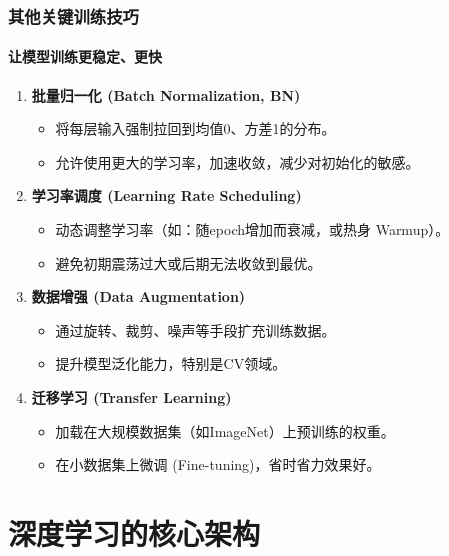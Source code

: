 \documentclass[12pt, t, aspectratio=169]{beamer}
\begin{document}
\begin{frame}
    \frametitle{其他关键训练技巧}
    \framesubtitle{让模型训练更稳定、更快}
    
    \begin{enumerate}
        \item \textbf{批量归一化 (Batch Normalization, BN)}
        \begin{itemize}
            \item 将每层输入强制拉回到均值0、方差1的分布。
            \item 允许使用更大的学习率，加速收敛，减少对初始化的敏感。
        \end{itemize}
        
        \item \textbf{学习率调度 (Learning Rate Scheduling)}
        \begin{itemize}
            \item 动态调整学习率（如：随epoch增加而衰减，或热身 Warmup）。
            \item 避免初期震荡过大或后期无法收敛到最优。
        \end{itemize}
        
        \item \textbf{数据增强 (Data Augmentation)}
        \begin{itemize}
            \item 通过旋转、裁剪、噪声等手段扩充训练数据。
            \item 提升模型泛化能力，特别是CV领域。
        \end{itemize}
        
        \item \textbf{迁移学习 (Transfer Learning)}
        \begin{itemize}
            \item 加载在大规模数据集（如ImageNet）上预训练的权重。
            \item 在小数据集上微调 (Fine-tuning)，省时省力效果好。
        \end{itemize}
    \end{enumerate}
\end{frame}

\section{深度学习的核心架构}
\end{document}
